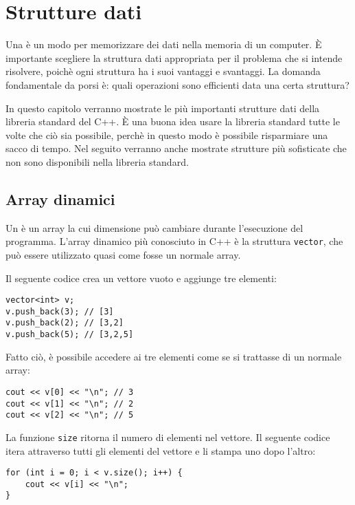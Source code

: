 \chapter{Strutture dati}


Una  è un modo per 
memorizzare dei dati nella memoria di un computer.
È importante scegliere la struttura dati appropriata
per il problema che si intende risolvere,
poichè ogni struttura ha i suoi vantaggi
e svantaggi.
La domanda fondamentale da porsi è: quali operazioni
sono efficienti data una certa struttura?

In questo capitolo verranno mostrate le più
importanti strutture dati della libreria standard
del C++.
È una buona idea usare la libreria standard 
tutte le volte che ciò sia possibile,
perchè in questo modo è possibile risparmiare
una sacco di tempo.
Nel seguito verranno anche mostrate strutture più
sofisticate che non sono disponibili nella libreria standard.


\section{Array dinamici}


Un  è un array la cui dimensione
può cambiare durante l'esecuzione del programma.
L'array dinamico più conosciuto in C++
è la struttura \texttt{vector},
che può essere utilizzato quasi come fosse un normale array.

Il seguente codice crea un vettore vuoto e
aggiunge tre elementi:

\begin{lstlisting}
vector<int> v;
v.push_back(3); // [3]
v.push_back(2); // [3,2]
v.push_back(5); // [3,2,5]
\end{lstlisting}

Fatto ciò, è possibile accedere ai tre elementi come se si trattasse di un normale array: 

\begin{lstlisting}
cout << v[0] << "\n"; // 3
cout << v[1] << "\n"; // 2
cout << v[2] << "\n"; // 5
\end{lstlisting}

La funzione \texttt{size} ritorna il numero di elementi nel vettore.
Il seguente codice itera attraverso tutti gli elementi
del vettore e li stampa uno dopo l'altro:

\begin{lstlisting}
for (int i = 0; i < v.size(); i++) {
    cout << v[i] << "\n";
}
\end{lstlisting}


